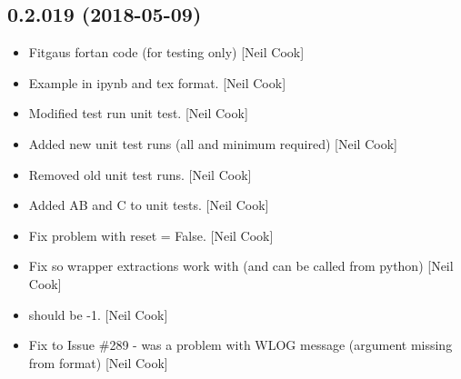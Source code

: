 \documentclass[a4paper,10pt,english]{report}
\begin{document}
\subsection{0.2.019 (2018-05-09)}
\label{\detokenize{misc/changelog:id440}}\begin{itemize}
\item {} 
Fitgaus fortan code (for testing only) {[}Neil Cook{]}

\item {} 
Example in ipynb and tex format. {[}Neil Cook{]}

\item {} 
Modified test run unit test. {[}Neil Cook{]}

\item {} 
Added new unit test runs (all and minimum required) {[}Neil Cook{]}

\item {} 
Removed old unit test runs. {[}Neil Cook{]}

\item {} 
Added  AB and C to unit tests. {[}Neil Cook{]}

\item {} 
Fix problem with reset = False. {[}Neil Cook{]}

\item {} 
Fix so wrapper extractions work with  (and can be called
from python) {[}Neil Cook{]}

\item {} 
 should be -1. {[}Neil Cook{]}

\item {} 
Fix to Issue \#289 - was a problem with WLOG message (argument missing
from format) {[}Neil Cook{]}

\end{itemize}
\end{document}
